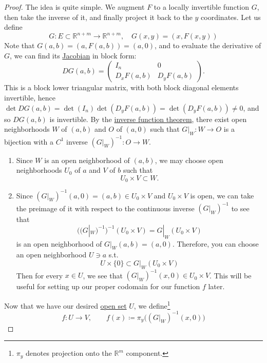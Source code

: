 	\begin{proof}
		The idea is quite simple. We augment $F$ to a locally invertible function $G$, then take the inverse of it, and finally project it back to the $y$ coordinates. Let us define 
		\begin{equation}
			G: E \subset \mathbb{R}^{n + m} \to \mathbb{R}^{n + m}, \quad G(x, y) = (x, F(x, y))
		\end{equation} 
		Note that $G(a, b) = (a, F(a, b)) = (a, 0)$, and to evaluate the derivative of $G$, we can find its \hyperref[def:jacobian]{Jacobian} in block form: 
		\begin{equation}
			DG(a,b) = \begin{pmatrix}
				I_n & 0 \\
				D_xF(a,b) & D_yF(a,b)
			\end{pmatrix}.
		\end{equation}
		This is a block lower triangular matrix, with both block diagonal elements invertible, hence $\det DG(a,b) = \det(I_n)\det(D_yF(a,b)) = \det(D_yF(a,b)) \neq 0$, and so $DG(a,b)$ is invertible. By the \hyperref[thm:inverse-function-theorem]{inverse function theorem}, there exist open neighborhoods $W$ of $(a,b)$ and $O$ of $(a,0)$ such that $G|_W : W \to O$ is a bijection with a $C^1$ inverse $(G|_W)^{-1}: O \to W$. 
		\begin{enumerate}
		  \item Since $W$ is an open neighborhood of $(a,b)$, we may choose open neighborhoods $U_0$ of $a$ and $V$ of $b$ such that
				\begin{equation}
					U_0 \times V \subset W.
				\end{equation}

			\item Since $(G|_W)^{-1} (a, 0) = (a, b) \in U_0 \times V$ and $U_0 \times V$ is open, we can take the preimage of it with respect to the continuous inverse $(G|_W)^{-1}$ to see that 
				\begin{equation}
					\big((G|_W)^{-1} \big)^{-1} (U_0 \times V) = G|_W (U_0 \times V)
				\end{equation}
				is an open neighborhood of $G|_W (a, b) = (a, 0)$. Therefore, you can choose an open neighborhood $U \ni a$ s.t. 
				\begin{equation}
					U \times \{0\} \subset G|_W (U_0 \times V)
				\end{equation}
				Then for every $x \in U$, we see that $(G|_W)^{-1} (x, 0) \in U_0 \times V$. This will be useful for setting up our proper codomain for our function $f$ later. 
		\end{enumerate} 
		Now that we have our desired \hyperref[pst-def:open-set]{open set} $U$, we define\footnote{$\pi_y$ denotes projection onto the $\mathbb{R}^m$ component.}
		\begin{equation}
			f: U \to V, \qquad f(x) \coloneqq \pi_y\big((G|_W)^{-1}(x,0)\big)
		\end{equation} 


\end{proof}
